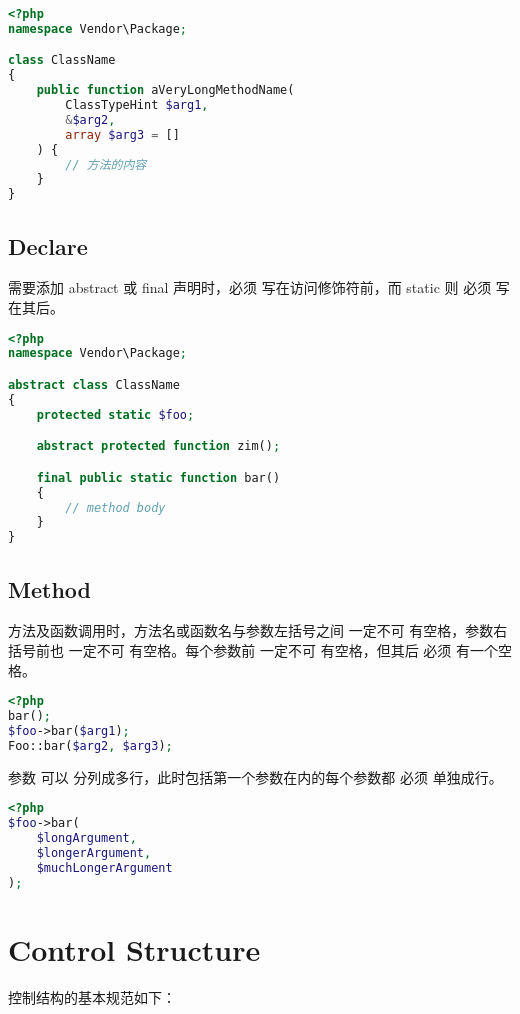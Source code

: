 \begin{lstlisting}[language=PHP]
<?php
namespace Vendor\Package;

class ClassName
{
    public function aVeryLongMethodName(
        ClassTypeHint $arg1,
        &$arg2,
        array $arg3 = []
    ) {
        // 方法的内容
    }
}
\end{lstlisting}


\subsection{Declare}

需要添加 abstract 或 final 声明时，必须 写在访问修饰符前，而 static 则 必须 写在其后。

\begin{lstlisting}[language=PHP]
<?php
namespace Vendor\Package;

abstract class ClassName
{
    protected static $foo;

    abstract protected function zim();

    final public static function bar()
    {
        // method body
    }
}
\end{lstlisting}


\subsection{Method}

方法及函数调用时，方法名或函数名与参数左括号之间 一定不可 有空格，参数右括号前也 一定不可 有空格。每个参数前 一定不可 有空格，但其后 必须 有一个空格。




\begin{lstlisting}[language=PHP]
<?php
bar();
$foo->bar($arg1);
Foo::bar($arg2, $arg3);
\end{lstlisting}

参数 可以 分列成多行，此时包括第一个参数在内的每个参数都 必须 单独成行。

\begin{lstlisting}[language=PHP]
<?php
$foo->bar(
    $longArgument,
    $longerArgument,
    $muchLongerArgument
);
\end{lstlisting}

\section{Control Structure}


控制结构的基本规范如下：

